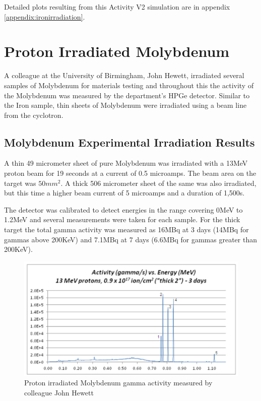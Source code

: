 Detailed plots resulting from this Activity V2 simulation are in appendix \ref{appendix:ironirradiation}.





\section{Proton Irradiated Molybdenum}

A colleague at the University of Birmingham, John Hewett, irradiated several samples of Molybdenum for materials testing and throughout this the activity of the Molybdenum was measured by the department's HPGe detector\cite{johnhewett}.  Similar to the Iron sample, thin sheets of Molybdenum were irradiated using a beam line from the cyclotron.


\subsection[Experimental Irradiation - Molybdenum]{Molybdenum Experimental Irradiation Results}

A thin 49 micrometer sheet of pure Molybdenum was irradiated with a 13MeV proton beam for 19 seconds at a current of 0.5 microamps.  The beam area on the target was $50mm^2$.  A thick 506 micrometer sheet of the same was also irradiated, but this time a higher beam current of  5 microamps and a duration of 1,500s.

The detector was calibrated to detect energies in the range covering 0MeV to 1.2MeV and several measurements were taken for each sample.  For the thick target the total gamma activity was measured as 16MBq at 3 days (14MBq for gammas above 200KeV) and 7.1MBq at 7 days (6.6MBq for gammas greater than 200KeV).

\begin{figure}[htb]
\centering
\includegraphics[width=0.7\linewidth]{chapters/activity_code/mo-john-hewett/john_mo_results.png}
\caption{Proton irradiated Molybdenum gamma activity measured by colleague John Hewett}
\label{fig:john-hewett-mo}
\end{figure}

